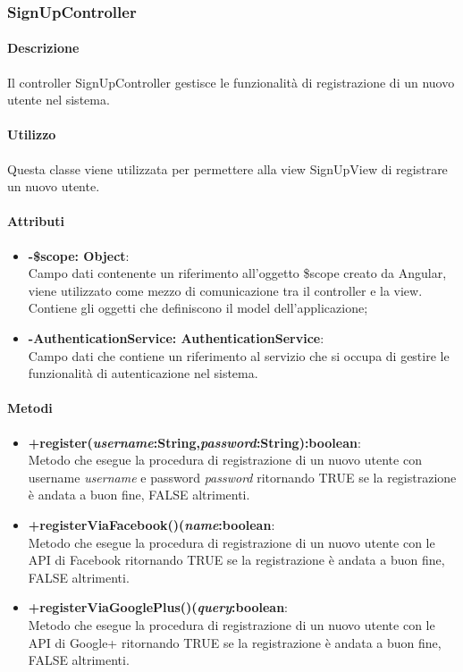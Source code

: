 \subsubsection{SignUpController}
	\paragraph{Descrizione}
	Il controller SignUpController gestisce le funzionalità di registrazione di un nuovo utente nel sistema.
	
	\paragraph{Utilizzo}
	Questa classe viene utilizzata per permettere alla view SignUpView di registrare un nuovo utente.\\
	\paragraph{Attributi}
	\begin{itemize}
		\item \textbf{-\$scope: Object}:\\
			Campo dati contenente un riferimento all'oggetto \$scope creato da Angular, viene utilizzato come mezzo di comunicazione tra il controller e la view. Contiene gli oggetti che definiscono il model dell'applicazione;
		\item \textbf{-AuthenticationService: AuthenticationService}:\\
			Campo dati che contiene un riferimento al servizio che si occupa di gestire le funzionalità di autenticazione nel sistema.
	\end{itemize}
	
	\paragraph{Metodi}
	\begin{itemize}
	  \item \textbf{+register(\textit{username}:String,\textit{password}:String):boolean}:\\
		 Metodo che esegue la procedura di registrazione di un nuovo utente con username \textit{username} e password \textit{password} ritornando TRUE se la registrazione è andata a buon fine, FALSE altrimenti.
	  \item \textbf{+registerViaFacebook()(\textit{name}:boolean}:\\
		 Metodo che esegue la procedura di registrazione di un nuovo utente con le API di Facebook ritornando TRUE se la registrazione è andata a buon fine, FALSE altrimenti.
	  \item \textbf{+registerViaGooglePlus()(\textit{query}:boolean}:\\
		 Metodo che esegue la procedura di registrazione di un nuovo utente con le API di Google+ ritornando TRUE se la registrazione è andata a buon fine, FALSE altrimenti.
		  
	\end{itemize}
